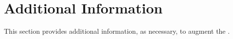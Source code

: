 
\chapter{Additional Information}
\label{loc:AdditionalInformation}


This section provides additional information, as necessary, to augment the \STS.
